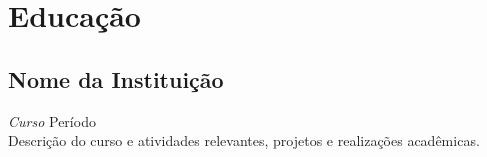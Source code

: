 \documentclass[a4paper,10pt]{article}
\begin{document}
\section*{Educação}
\noindent\makebox[\linewidth]{\rule{\linewidth}{0.1mm}\textcolor{corLarge}{}}

\subsection*{Nome da Instituição}
\emph{Curso} \hfill Período\\
Descrição do curso e atividades relevantes, projetos e realizações acadêmicas.

\end{document}
